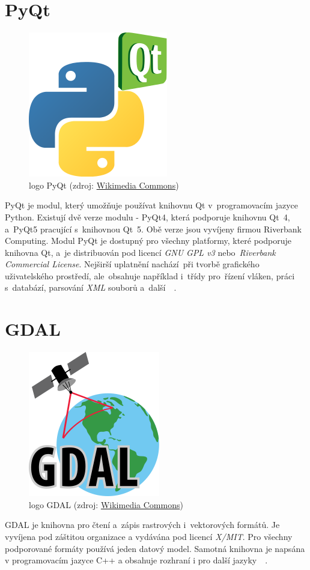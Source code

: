 \section{PyQt}
\label{pyqt}

	\begin{figure}[H]
		\centering
		\includegraphics[width=.2\textwidth]{./pictures/pyqt_logo.png}
      	\caption[logo PyQt]{logo PyQt (zdroj: \href{https://commons.wikimedia.org/wiki/File:Python_and_Qt.svg}{Wikimedia Commons})}
		\label{fig:pyqt_logo}
 	\end{figure}

PyQt je modul, který umožňuje používat knihovnu Qt v~programovacím jazyce Python. Existují dvě verze modulu - PyQt4, která podporuje knihovnu Qt~4, a~PyQt5 pracující s~knihovnou Qt~5. Obě verze jsou vyvíjeny firmou Riverbank Computing. Modul PyQt je dostupný pro všechny platformy, které podporuje knihovna Qt, a~je distribuován pod licencí \textit{GNU GPL v3} nebo~\textit{Riverbank Commercial License}. Nejširší uplatnění nachází~při tvorbě grafického uživatelského prostředí, ale~obsahuje například i~třídy pro~řízení vláken, práci s~databází, parsování \textit{XML} souborů a~další~\citep{pyqt}~\citep{wiki_pyqt}.

\section{GDAL}
\label{gdal}

	\begin{figure}[H]
		\centering
		\includegraphics[width=.2\textwidth]{./pictures/gdal_logo.png}
      	\caption[logo GDAL]{logo GDAL (zdroj: \href{https://commons.wikimedia.org/wiki/File:GDALLogoColor.svg}{Wikimedia Commons})}
		\label{fig:gdal_logo}
 	\end{figure}

GDAL je knihovna pro čtení a~zápis rastrových i~vektorových  formátů. Je vyvíjena pod záštitou organizace  a vydávána pod licencí \textit{X/MIT}. Pro všechny podporované formáty používá jeden datový model. Samotná knihovna je napsána v programovacím jazyce C++ a obsahuje rozhraní i pro další jazyky~\citep{gdal}~\citep{wiki_gdal}.

